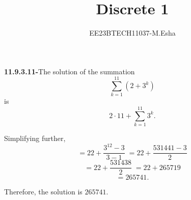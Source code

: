 \documentclass{article}
\title{Discrete 1}
\author{EE23BTECH11037-M.Esha}
\date{}
\begin{document}
\maketitle

\textbf{11.9.3.11-}The solution of the summation
\[
\sum_{k=1}^{11} (2 + 3^k)
\]
is
\[
2 \cdot 11 + \sum_{k=1}^{11} 3^k.
\]

Simplifying further,
\[
=22 + \frac{3^{12} - 3}{3 - 1} \;= 22 + \frac{531441 - 3}{2}\]\[ = 22 + \frac{531438}{2} \; = 22 + 265719 \]\[= 265741.
\]

Therefore, the solution is \(265741\).
\end{document}
